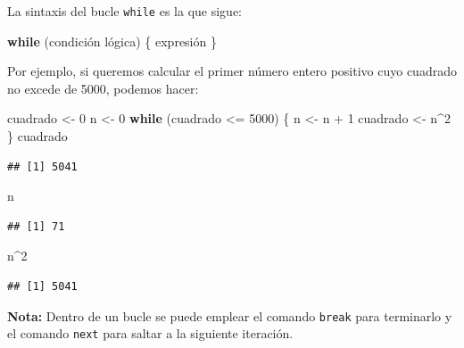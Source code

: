 \documentclass[
]{book}
\newenvironment{Shaded}{\begin{snugshade}}{\end{snugshade}}
\newcommand{\ControlFlowTok}[1]{\textcolor[rgb]{0.13,0.29,0.53}{\textbf{#1}}}
\newcommand{\DecValTok}[1]{\textcolor[rgb]{0.00,0.00,0.81}{#1}}
\newcommand{\NormalTok}[1]{#1}
\newcommand{\OtherTok}[1]{\textcolor[rgb]{0.56,0.35,0.01}{#1}}
\newcommand{\SpecialCharTok}[1]{\textcolor[rgb]{0.00,0.00,0.00}{#1}}
\theoremstyle{break}
\begin{document}
La sintaxis del bucle \texttt{while}
es la que sigue:

\begin{Shaded}
\begin{Highlighting}[]
\ControlFlowTok{while}\NormalTok{ (condición lógica)  \{ expresión \}}
\end{Highlighting}
\end{Shaded}

Por ejemplo, si queremos calcular el primer número entero positivo cuyo
cuadrado no excede de 5000, podemos hacer:

\begin{Shaded}
\begin{Highlighting}[]
\NormalTok{cuadrado }\OtherTok{\textless{}{-}} \DecValTok{0}
\NormalTok{n }\OtherTok{\textless{}{-}} \DecValTok{0}
\ControlFlowTok{while}\NormalTok{ (cuadrado }\SpecialCharTok{\textless{}=} \DecValTok{5000}\NormalTok{) \{}
\NormalTok{  n }\OtherTok{\textless{}{-}}\NormalTok{ n }\SpecialCharTok{+} \DecValTok{1}
\NormalTok{  cuadrado }\OtherTok{\textless{}{-}}\NormalTok{ n}\SpecialCharTok{\^{}}\DecValTok{2}
\NormalTok{\}}
\NormalTok{cuadrado}
\end{Highlighting}
\end{Shaded}

\begin{verbatim}
## [1] 5041
\end{verbatim}

\begin{Shaded}
\begin{Highlighting}[]
\NormalTok{n}
\end{Highlighting}
\end{Shaded}

\begin{verbatim}
## [1] 71
\end{verbatim}

\begin{Shaded}
\begin{Highlighting}[]
\NormalTok{n}\SpecialCharTok{\^{}}\DecValTok{2}
\end{Highlighting}
\end{Shaded}

\begin{verbatim}
## [1] 5041
\end{verbatim}

\textbf{Nota:} Dentro de un bucle se puede emplear el comando \texttt{break} para terminarlo y el comando \texttt{next} para saltar a la siguiente iteración.
\end{document}
